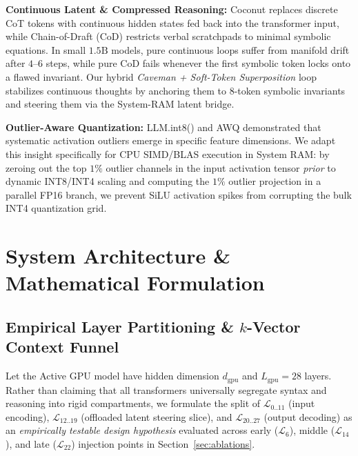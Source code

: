 \documentclass[10pt,twocolumn]{article}
\begin{document}
\textbf{Continuous Latent \& Compressed Reasoning:} Coconut \cite{hao2024training} replaces discrete CoT tokens with continuous hidden states fed back into the transformer input, while Chain-of-Draft (CoD) \cite{xu2025chain} restricts verbal scratchpads to minimal symbolic equations. In small $1.5\text{B}$ models, pure continuous loops suffer from manifold drift after $4\text{--}6$ steps, while pure CoD fails whenever the first symbolic token locks onto a flawed invariant. Our hybrid \emph{Caveman + Soft-Token Superposition} loop stabilizes continuous thoughts by anchoring them to 8-token symbolic invariants and steering them via the System-RAM latent bridge.

\textbf{Outlier-Aware Quantization:} LLM.int8() \cite{dettmers2022llm} and AWQ \cite{lin2024awq} demonstrated that systematic activation outliers emerge in specific feature dimensions. We adapt this insight specifically for CPU SIMD/BLAS execution in System RAM: by zeroing out the top $1\%$ outlier channels in the input activation tensor \emph{prior} to dynamic INT8/INT4 scaling and computing the $1\%$ outlier projection in a parallel FP16 branch, we prevent SiLU activation spikes from corrupting the bulk INT4 quantization grid.

\section{System Architecture \& Mathematical Formulation}

\subsection{Empirical Layer Partitioning \& $k$-Vector Context Funnel}
Let the Active GPU model have hidden dimension $d_{\text{gpu}}$ and $L_{\text{gpu}} = 28$ layers. Rather than claiming that all transformers universally segregate syntax and reasoning into rigid compartments, we formulate the split of $\mathcal{L}_{0..11}$ (input encoding), $\mathcal{L}_{12..19}$ (offloaded latent steering slice), and $\mathcal{L}_{20..27}$ (output decoding) as an \emph{empirically testable design hypothesis} evaluated across early ($\mathcal{L}_6$), middle ($\mathcal{L}_{14}$), and late ($\mathcal{L}_{22}$) injection points in Section~\ref{sec:ablations}.
\end{document}
